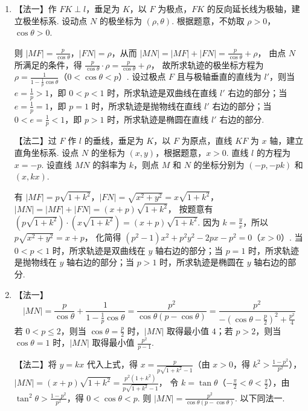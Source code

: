\documentclass[UTF8,a4paper,oneside,11pt]{ctexbook}
\begin{document}
\begin{solution}
\begin{enumerate}
\item 【法一】作 \(FK\perp l\)，垂足为 \(K\)，以 \(F\) 为极点，\(FK\) 的反向延长线为极轴，建立极坐标系. 设动点 \(N\) 的极坐标为 \((\rho,\theta)\). 根据题意，不妨取 \(\rho>0\)，\(\cos\theta>0\).


则 \(|MF|=\frac{p}{\cos\theta}\)，\(|FN|=\rho\)，从而 \(|MN|=|MF|+|FN|=\frac{p}{\cos\theta}+\rho\)，
由点 \(N\) 所满足的条件，得 \(\frac{p}{\cos\theta}\cdot \rho=\frac{p}{\cos\theta}+\rho\)，
故所求轨迹的极坐标方程为 \(\rho=\frac{1}{1-\frac{1}{p}\cos\theta}\)（\(0<\cos\theta<p\)）.
设过极点 \(F\) 且与极轴垂直的直线为 \(l'\)，则当 \(e=\frac{1}{p}>1\)，即 \(0<p<1\) 时，所求轨迹是双曲线在直线 \(l'\) 右边的部分；当 \(e=\frac{1}{p}=1\)，即 \(p=1\) 时，所求轨迹是抛物线在直线 \(l'\) 右边的部分；当 \(0<e=\frac{1}{p}<1\)，即 \(p>1\) 时，所求轨迹是椭圆在直线 \(l'\) 右边的部分.

【法二】过 \(F\) 作 \(l\) 的垂线，垂足为 \(K\)，以 \(F\) 为原点，直线 \(KF\) 为 \(x\) 轴，建立直角坐标系. 设点 \(N\) 的坐标为 \((x,y)\)，根据题意，\(x>0\). 直线 \(l\) 的方程为 \(x=-p\). 设直线 \(MN\) 的斜率为 \(k\)，则点 \(M\) 和 \(N\) 的坐标分别为 \((-p,-pk)\) 和 \((x,kx)\).


有 \(|MF|=p\sqrt{1+k^2}\)，\(|FN|=\sqrt{x^2+y^2}=x\sqrt{1+k^2}\)，\(|MN|=|MF|+|FN|=(x+p)\sqrt{1+k^2}\)，
按题意有 \((p\sqrt{1+k^2})\cdot (x\sqrt{1+k^2})=(x+p)\sqrt{1+k^2}\). 因为 \(k=\frac{y}{x}\)，所以 \(p\sqrt{x^2+y^2}=x+p\)，
化简得 \((p^2-1)x^2+p^2y^2-2px-p^2=0\)（\(x>0\)）.
当 \(0<p<1\) 时，所求轨迹是双曲线在 \(y\) 轴右边的部分；当 \(p=1\) 时，所求轨迹是抛物线在 \(y\) 轴右边的部分；当 \(p>1\) 时，所求轨迹是椭圆在 \(y\) 轴右边的部分.

\item 【法一】
\[
|MN|=\frac{p}{\cos\theta}+\frac{1}{1-\frac{1}{p}\cos\theta}=\frac{p^2}{\cos\theta (p-\cos\theta)}=\frac{p^2}{-\left( \cos\theta-\frac{p}{2} \right)^2+\frac{p^2}{4}}
\]
若 \(0<p\leqslant 2\)，则当 \(\cos\theta=\frac{p}{2}\) 时，\(|MN|\) 取得最小值 \(4\)；若 \(p>2\)，则当 \(\cos\theta=1\) 时，\(|MN|\) 取得最小值 \(\frac{p^2}{p-1}\).

【法二】将 \(y=kx\) 代入上式，得 \(x=\frac{p}{p\sqrt{1+k^2}-1}\)（由 \(x>0\)，得 \(k^2>\frac{1-p^2}{p^2}\)），
\(|MN|=(x+p)\sqrt{1+k^2}=\frac{p^2(1+k^2)}{p\sqrt{1+k^2}-1}\)，
令 \(k=\tan\theta\)（\(-\frac{\pi}{2}<\theta<\frac{\pi}{2}\)），由 \(\tan^2\theta>\frac{1-p^2}{p^2}\)，得 \(0<\cos\theta<p\). 则 \(|MN|=\frac{p^2}{\cos\theta (p-\cos\theta)}\).
以下同法一.
\end{enumerate}
\end{solution}

\end{document}
